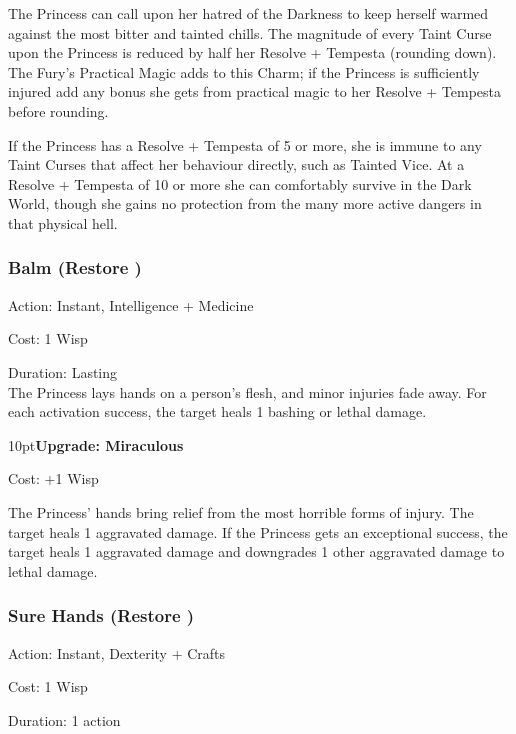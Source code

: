 The Princess can call upon her hatred of the Darkness to keep herself warmed against the most bitter and tainted chills. The magnitude of every Taint Curse upon the Princess is reduced by half her Resolve + Tempesta (rounding down). The Fury's Practical Magic adds to this Charm; if the Princess is sufficiently injured add any bonus she gets from practical magic to her Resolve + Tempesta before rounding.

If the Princess has a Resolve + Tempesta of 5 or more, she is immune to any Taint Curses that affect her behaviour directly, such as Tainted Vice. At a Resolve + Tempesta of 10 or more she can comfortably survive in the Dark World, though she gains no protection from the many more active dangers in that physical hell.
\subsubsection*{Balm (Restore \textbullet\textbullet)}

\noindent Action: Instant, Intelligence  + Medicine

\noindent Cost: 1 Wisp

\noindent Duration: Lasting \\

\noindent The Princess lays hands on a person's flesh, and minor injuries fade away. For each activation success, the target heals 1 bashing or lethal damage.

\begin{myindentpar}{10pt}\textbf{Upgrade: Miraculous}

\noindent Cost: +1 Wisp

The Princess' hands bring relief from the most horrible forms of injury. The target heals 1 aggravated damage. If the Princess gets an exceptional success, the target heals 1 aggravated damage and downgrades 1 other aggravated damage to lethal damage.\end{myindentpar}

\subsubsection*{Sure Hands (Restore \textbullet\textbullet)}

\noindent Action: Instant, Dexterity + Crafts

\noindent Cost: 1 Wisp

\noindent Duration: 1 action \\

